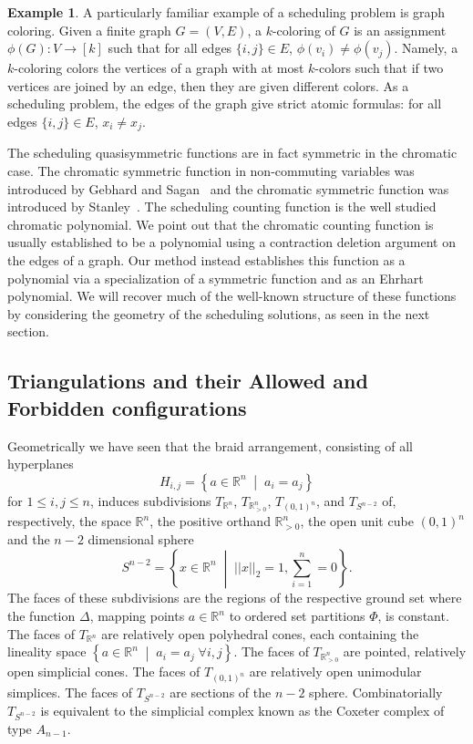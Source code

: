 \documentclass[12pt,reqno]{amsart}
\numberwithin{definition}{section}
\theoremstyle{definition}
\newtheorem{example}[definition]{Example}
\newcommand{\RR}{\mathbb{R}}
\newcommand{\SSS}{\mathcal{S}}
\newcommand{\mset}[2]{ \left\{ #1 \; \middle| \; #2 \right\}}
\newcommand{\T}{T} %
\newcommand{\TRn}{\T_{\RR^n}} %
\newcommand{\TS}{\T_{S^{n-2}}} %
\newcommand{\TP}{\T_{\RR^n_{> 0}}} %
\newcommand{\TC}{\T_{(0,1)^n}} %
\newcommand{\poly}{\chi} %
\begin{document}
\begin{example}
A particularly familiar example of a scheduling problem is graph
coloring.  Given a finite graph $G = (V,E)$, a $k$-coloring of $G$ is
an assignment $\phi(G): V \rightarrow [k]$ such that for all edges
$\{i,j\} \in E$, $\phi(v_i) \neq \phi(v_j)$.  Namely, a
$k$-coloring colors the vertices of a graph with at most $k$-colors
such that if two vertices are joined by an edge, then they are given
different colors.  As a scheduling problem, the edges of the graph
give strict atomic formulas: for all edges $\{i,j\} \in E$, $x_i
\neq x_j$.  

The scheduling quasisymmetric functions are in fact symmetric in the
chromatic case.  The chromatic symmetric function in non-commuting
variables was introduced by Gebhard and Sagan~\cite{GS} and the
chromatic symmetric function was introduced by
Stanley~\cite{stan-chromatic}.  The scheduling counting function is
the well studied chromatic polynomial.  We point out that the
chromatic counting function is usually established to be a polynomial
using a contraction deletion argument on the edges of a graph.  Our
method instead establishes this function as a polynomial via a
specialization of a symmetric function and as an Ehrhart polynomial.  We will recover much of the well-known structure of these functions by considering the geometry of the scheduling solutions, as seen in the next section.

\end{example}


\subsection{Triangulations and their Allowed and Forbidden configurations}
\label{sec:allow-forb-configurations}
Geometrically we have seen that
the braid arrangement, consisting of all hyperplanes
\[
  H_{i,j} = \mset{a\in\RR^n}{a_i = a_j}
\]
for $1\leq i,j\leq n$, induces subdivisions $\TRn$, $\TP$, $\TC$, and $\TS$ of, respectively, the space $\RR^n$, the positive orthand $\RR^n_{> 0}$, the open unit cube $(0,1)^n$ and the $n-2$ dimensional sphere
\[
S^{n-2}=\mset{x\in\RR^n}{||x||_2 = 1, \sum_{i=1}^n = 0}.
\]
 The faces of these subdivisions are the regions of the respective ground set where the function $\Delta$, mapping points $a\in\RR^n$ to ordered set partitions $\Phi$, is constant. The faces of $\TRn$ are relatively open polyhedral cones, each containing the lineality space $\mset{a\in\RR^n}{a_i=a_j \; \forall i,j}$. The faces of $\TP$ are pointed, relatively open simplicial cones. The faces of $\TC$ are relatively open unimodular simplices. The faces of $\TS$ are sections of the $n-2$ sphere. Combinatorially $\TS$ is equivalent to the simplicial complex known as the Coxeter complex of type $A_{n-1}$.
\end{document}
